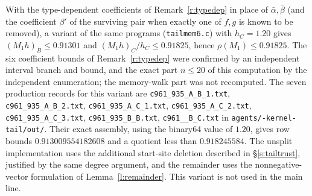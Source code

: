 \begin{remark}\label{r:tailtypedep}
With the type-dependent coefficients of Remark~\ref{r:typedep} in place of $\bar\alpha, \bar\beta$ (and the coefficient $\beta'$ of the surviving pair when exactly one of $f, g$ is known to be removed), a variant of the same programs (\texttt{tailmem6.c}) with $h_C = 1.20$ gives $(M_1 h)_B \le 0.91301$ and $(M_1 h)_C / h_C \le 0.91825$, hence $\rho(M_1) \le 0.91825$. The six coefficient bounds of Remark~\ref{r:typedep} were confirmed by an independent interval branch and bound, and the exact part $n \le 20$ of this computation by the independent enumeration; the memory-walk part was not recomputed. The seven production records for this variant are
\texttt{c961\_935\_A\_B\_1.txt}, \texttt{c961\_935\_A\_B\_2.txt},
\texttt{c961\_935\_A\_C\_1.txt}, \texttt{c961\_935\_A\_C\_2.txt},
\texttt{c961\_935\_A\_C\_3.txt}, \texttt{c961\_935\_B\_B.txt},
\texttt{c961\_\_\allowbreak B\_\allowbreak C.txt}\linebreak
in \texttt{agents/-kernel-tail/\allowbreak out/}.
Their exact assembly, using the binary64 value of $1.20$, gives row bounds
$0.913009554182608$ and a quotient less than $0.918245584$.
The unsplit implementation uses the additional start-site deletion described in \S\ref{s:tailtrust}, justified by the same degree argument, and the remainder uses the nonnegative-vector formulation of Lemma~\ref{l:remainder}.
This variant is not used in the main line.
\end{remark}
